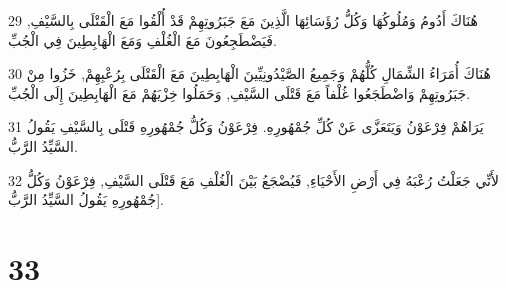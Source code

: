 \par 29 هُنَاكَ أَدُومُ وَمُلُوكُهَا وَكُلُّ رُؤَسَائِهَا الَّذِينَ مَعَ جَبَرُوتِهِمْ قَدْ أُلْقُوا مَعَ الْقَتْلَى بِالسَّيْفِ, فَيَضْطَجِعُونَ مَعَ الْغُلْفِ وَمَعَ الْهَابِطِينَ فِي الْجُبِّ.
\par 30 هُنَاكَ أُمَرَاءُ الشِّمَالِ كُلُّهُمْ وَجَمِيعُ الصَّيْدُونِيِّينَ الْهَابِطِينَ مَعَ الْقَتْلَى بِرُعْبِهِمْ, خَزُوا مِنْ جَبَرُوتِهِمْ وَاضْطَجَعُوا غُلْفاً مَعَ قَتْلَى السَّيْفِ, وَحَمَلُوا خِزْيَهُمْ مَعَ الْهَابِطِينَ إِلَى الْجُبِّ.
\par 31 يَرَاهُمْ فِرْعَوْنُ وَيَتَعَزَّى عَنْ كُلِّ جُمْهُورِهِ. فِرْعَوْنُ وَكُلُّ جُمْهُورِهِ قَتْلَى بِالسَّيْفِ يَقُولُ السَّيِّدُ الرَّبُّ.
\par 32 لأَنِّي جَعَلْتُ رُعْبَهُ فِي أَرْضِ الأَحْيَاءِ, فَيُضْجَعُ بَيْنَ الْغُلْفِ مَعَ قَتْلَى السَّيْفِ, فِرْعَوْنُ وَكُلُّ جُمْهُورِهِ يَقُولُ السَّيِّدُ الرَّبُّ].

\chapter{33}

